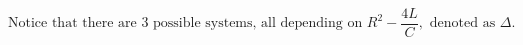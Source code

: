 \documentclass[preview]{standalone}
\begin{document}
\begin{center}
\[\text{Notice that there are 3 possible systems, all depending on } 
                    R^2 - \frac{4L}{C}, \text{ denoted as } \Delta.\]
\end{center}
\end{document}
